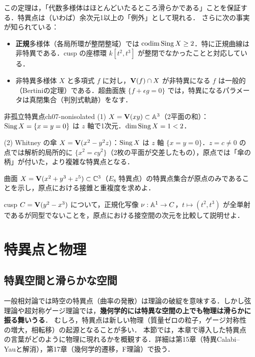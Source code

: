 この定理は，「代数多様体はほとんどいたるところ滑らかである」ことを保証する．特異点は（いわば）余次元1以上の「例外」として現れる．
さらに次の事実が知られている：

\begin{itemize}
  \item \textbf{正規}多様体（各局所環が整閉整域）では $\operatorname{codim}\operatorname{Sing} X\ge2$．特に正規曲線は非特異である．cusp の座標環 $k[t^2,t^3]$ が整閉でなかったことと対応している．
  \item 非特異多様体 $X$ と多項式 $f$ に対し，$\mathbf{V}(f)\cap X$ が非特異になる $f$ は一般的（Bertiniの定理）である．超曲面族 $\{f+\epsilon g=0\}$ では，特異になるパラメータは真閉集合（判別式軌跡）をなす．
\end{itemize}

\begin{myex}{非孤立特異点}{ch07-nonisolated}
(1) $X=\mathbf{V}(xy)\subset\mathbb{A}^3$（2平面の和）：$\operatorname{Sing} X=\{x=y=0\}$ は $z$ 軸で1次元．$\dim\operatorname{Sing} X=1<2$．

(2) Whitney の傘 $X=\mathbf{V}(x^2-y^2z)$：$\operatorname{Sing} X$ は $z$ 軸 $\{x=y=0\}$．$z=c\ne0$ の点では解析的局所的に $\{x^2=cy^2\}$（2枚の平面が交差したもの），原点では「傘の柄」が付いた，より複雑な特異点となる．
\end{myex}

曲面 $X=\mathbf{V}(x^2+y^3+z^5)\subset\mathbb{C}^3$（$E_8$ 特異点）の特異点集合が原点のみであることを示し，原点における接錐と重複度を求めよ．

cusp $C=\mathbf{V}(y^2-x^3)$ について，正規化写像 $\nu:\mathbb{A}^1\to C$，$t\mapsto(t^2,t^3)$ が全単射であるが同型でないことを，原点における接空間の次元を比較して説明せよ．

\section{特異点と物理}

\subsection{特異空間と滑らかな空間}

一般相対論では時空の特異点（曲率の発散）は理論の破綻を意味する．しかし弦理論や超対称ゲージ理論では，\textbf{幾何学的には特異な空間の上でも物理は滑らかに振る舞いうる}．
むしろ，特異点は新しい物理（質量ゼロの粒子，ゲージ対称性の増大，相転移）の起源となることが多い．
本節では，本章で導入した特異点の言葉がどのように物理に現れるかを概観する．詳細は第15章（特異Calabi–Yauと解消），第17章（幾何学的遷移，F理論）で扱う．

